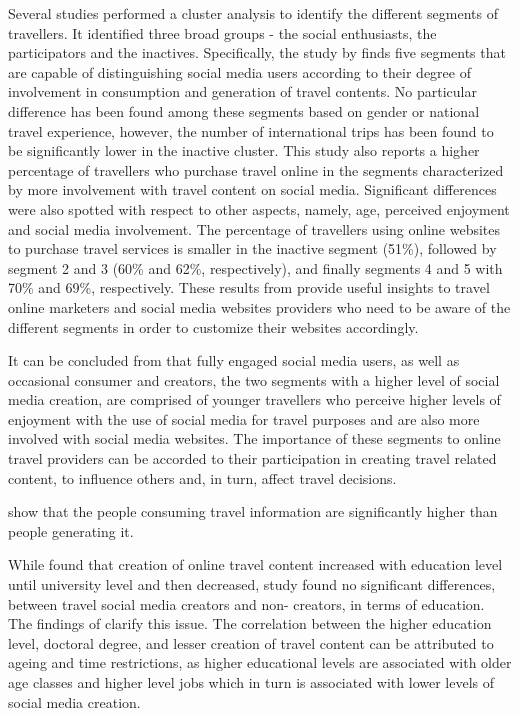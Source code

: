 Several studies \cite{chiu2012china}\cite{foster2011exploring}\cite{kurtulucs2015social} performed a cluster analysis to identify the different segments of travellers. It identified three broad groups - the social enthusiasts, the participators and the inactives. Specifically, the study by \cite{amaro2016travelers} finds five segments that are capable of distinguishing social media users according to their degree of involvement in consumption and generation of travel contents. No particular difference has been found among these segments based on gender or national travel experience, however, the number of international trips has been found to be significantly lower in the inactive cluster. This study also reports a higher percentage of travellers who purchase travel online in the segments characterized by more involvement with travel content on social media. Significant differences were also spotted with respect to other aspects, namely, age, perceived enjoyment and social media involvement. 	The percentage of travellers using online websites to purchase travel services is smaller in the inactive segment (51\%), followed by segment 2 and 3 (60\% and 62\%, respectively), and finally segments 4 and 5 with 70\% and 69\%, respectively.
These results from \cite{amaro2016travelers} provide useful insights to travel online marketers and social media websites providers who need to be aware of the different segments in order to customize their websites accordingly.

It can be concluded from \cite{amaro2016travelers} that fully engaged social media users, as well as occasional consumer and creators, the two segments with a higher level of social media creation, are comprised of younger travellers who perceive higher levels of enjoyment with the use of social media for travel purposes and are also more involved with social media websites. The importance of these segments to online travel providers can be accorded to their participation in creating travel related content, to influence others and, in turn, affect travel decisions.

\cite{pan2012theoretical}\cite{YOO2011609} show that the people consuming travel information are significantly higher than people generating it.  

While \cite{ip2012profiling} found that creation of online travel content increased with education level until university level and then decreased, \cite{yoo2016use} study found no significant differences, between travel social media creators and non- creators, in terms of education. The findings of \cite{maro2016travelers} clarify this issue. The correlation between the higher education level, doctoral degree, and lesser creation of travel content can be attributed to ageing and time restrictions, as higher educational levels are associated with older age classes and higher level jobs which in turn is associated with lower levels of social media creation. 


